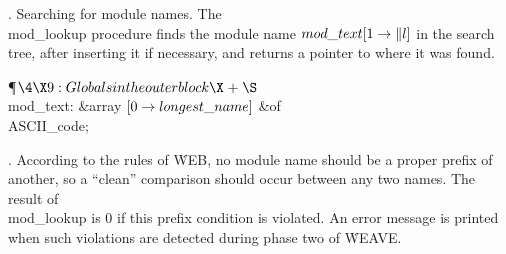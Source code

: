 .  Searching for module names.
The \\{mod\_lookup} procedure finds the module name $\\{mod\_text}[1\to\|l]$ in
the
search tree, after inserting it if necessary, and returns a pointer to
where it was found.

\Y\P$\4\X9:Globals in the outer block\X\mathrel{+}\S$\6
\4\\{mod\_text}: \&{array} $[0\to\\{longest\_name}]$ \1\&{of}\5
\\{ASCII\_code};\2\par
\fi

. According to the rules of \.{WEB}, no module name
should be a proper prefix of another, so a ``clean'' comparison should
occur between any two names. The result of \\{mod\_lookup} is 0 if this
prefix condition is violated. An error message is printed when such violations
are detected during phase two of \.{WEAVE}.

